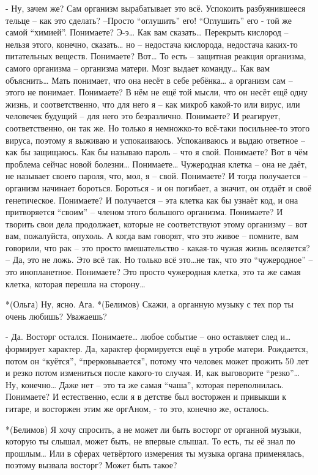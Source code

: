 - Ну, зачем же? Сам организм вырабатывает это всё. Успокоить разбуянившееся тельце – как это сделать? –Просто “оглушить” его! “Оглушить” его - той же самой “химией”. Понимаете? Э-э… Как вам сказать… Перекрыть кислород – нельзя этого, конечно, сказать… но – недостача кислорода, недостача каких-то питательных веществ. Понимаете? Вот… То есть – защитная реакция организма, самого организма – организма матери. Мозг выдает команду… Как вам объяснить… Мать понимает, что она несёт в себе ребёнка… а организм сам – этого не понимает. Понимаете? В нём не ещё той мысли, что он несёт ещё одну жизнь, и соответственно, что для него я – как микроб какой-то или вирус, или человечек будущий – для него это безразлично. Понимаете? И реагирует, соответственно, он  так же. Но только я немножко-то всё-таки посильнее-то этого вируса, поэтому я выживаю и успокаиваюсь. Успокаиваюсь и выдаю ответное – как бы защищаюсь. Как бы называю пароль – что я свой. Понимаете? Вот в чём  проблема сейчас новой болезни… Понимаете… Чужеродная клетка – она не даёт, не называет своего пароля, что, мол, я – свой. Понимаете? И тогда получается – организм начинает бороться. Бороться - и он погибает, а значит, он отдаёт и своё генетическое. Понимаете? И получается – эта клетка как бы узнаёт код, и она притворяется “своим” – членом этого большого организма. Понимаете? И творить свои дела продолжает, которые не соответствуют этому организму – вот вам, пожалуйста, опухоль. А когда вам говорят, что это живое – помните, вам говорили, что рак – это просто вмешательство - какая-то чужая жизнь вселяется? – Да, это не ложь. Это всё так. Но только всё это…не так, что это “чужеродное” – это инопланетное. Понимаете? Это просто чужеродная клетка, это та же самая клетка, которая перешла на сторону…

*(Ольга) Ну, ясно. Ага.
*(Белимов) Скажи, а органную музыку с тех пор ты очень любишь? Уважаешь?

- Да. Восторг остался. Понимаете… любое событие – оно оставляет след и…формирует характер. Да, характер формируется  ещё в утробе матери. Рождается, потом он “куётся”, “прерковывается”, потому что человек может прожить 50 лет и резко потом измениться после какого-то случая. И, как выговорите “резко”… Ну, конечно… Даже нет – это та же самая “чаша”, которая переполнилась. Понимаете?  И естественно, если я в детстве был восторжен и привыкши к гитаре, и восторжен этим же оргАном, - то это, конечно же, осталось.

*(Белимов) Я хочу спросить, а не может ли быть восторг от органной музыки, которую ты слышал, может быть, не впервые слышал. То есть,  ты её знал по прошлым… Или в сферах четвёртого измерения ты музыка органа применялась, поэтому вызвала восторг? Может быть такое?

